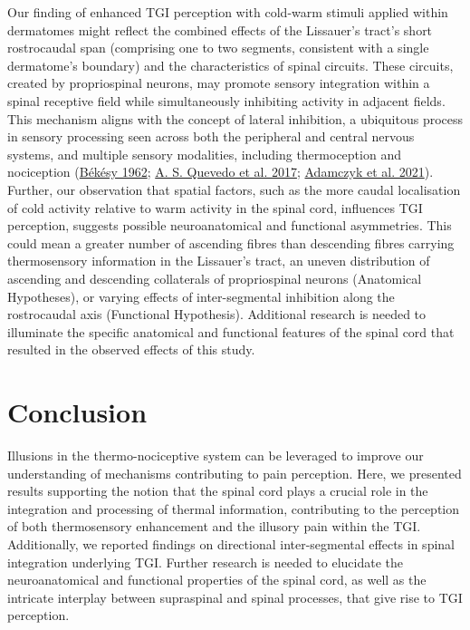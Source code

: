 \documentclass[
]{article}
\begin{document}
Our finding of enhanced TGI perception with cold-warm stimuli applied
within dermatomes might reflect the combined effects of the Lissauer's
tract's short rostrocaudal span (comprising one to two segments,
consistent with a single dermatome's boundary) and the characteristics
of spinal circuits. These circuits, created by propriospinal neurons,
may promote sensory integration within a spinal receptive field while
simultaneously inhibiting activity in adjacent fields. This mechanism
aligns with the concept of lateral inhibition, a ubiquitous process in
sensory processing seen across both the peripheral and central nervous
systems, and multiple sensory modalities, including thermoception and
nociception (\protect\hyperlink{ref-bekesy_lateral_1962}{Békésy 1962};
\protect\hyperlink{ref-quevedo_lateral_2017}{A. S. Quevedo et al. 2017};
\protect\hyperlink{ref-adamczyk_not_2021}{Adamczyk et al. 2021}).
Further, our observation that spatial factors, such as the more caudal
localisation of cold activity relative to warm activity in the spinal
cord, influences TGI perception, suggests possible neuroanatomical and
functional asymmetries. This could mean a greater number of ascending
fibres than descending fibres carrying thermosensory information in the
Lissauer's tract, an uneven distribution of ascending and descending
collaterals of propriospinal neurons (Anatomical Hypotheses), or varying
effects of inter-segmental inhibition along the rostrocaudal axis
(Functional Hypothesis). Additional research is needed to illuminate the
specific anatomical and functional features of the spinal cord that
resulted in the observed effects of this study.

\hypertarget{conclusion}{%
\section{Conclusion}\label{conclusion}}

Illusions in the thermo-nociceptive system can be leveraged to improve
our understanding of mechanisms contributing to pain perception. Here,
we presented results supporting the notion that the spinal cord plays a
crucial role in the integration and processing of thermal information,
contributing to the perception of both thermosensory enhancement and the
illusory pain within the TGI. Additionally, we reported findings on
directional inter-segmental effects in spinal integration underlying
TGI. Further research is needed to elucidate the neuroanatomical and
functional properties of the spinal cord, as well as the intricate
interplay between supraspinal and spinal processes, that give rise to
TGI perception.
\end{document}
